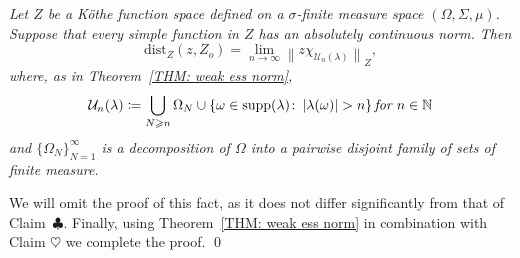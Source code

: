 \documentclass[11pt]{amsart}
\theoremstyle{definition}
\theoremstyle{definition}
\theoremstyle{definition}
\theoremstyle{definition}
\theoremstyle{definition}
\theoremstyle{definition}
\theoremstyle{definition}
\theoremstyle{definition}
\numberwithin{equation}{section}
\numberwithin{equation}{section}
\numberwithin{equation}{section}
\theoremstyle{definition}
\theoremstyle{definition}
\theoremstyle{definition}
\theoremstyle{definition}
\theoremstyle{definition}
\theoremstyle{definition}
\DeclareMathOperator{\supp}{supp}
\newcommand{\norm}[1]{\left\lVert#1\right\rVert}
\newcommand{\abs}[1]{\left\lvert#1\right\rvert}
\renewenvironment{proof}{\noindent {\bf Proof.}}{\qed}
\begin{document}
\begin{proof}
	\vspace{5pt} 
	{\it Let $Z$ be a K{\" o}the function space defined on a $\sigma$-finite measure space $(\Omega,\Sigma,\mu)$.
		Suppose that every simple function in $Z$ has an absolutely continuous norm. Then}
		\begin{equation}
			\text{dist}_Z(z,Z_o) = \lim\limits_{n \rightarrow \infty} \norm{z \chi_{\mathcal{U}_n(\lambda)}}_Z,
		\end{equation}
	{\it where, as in Theorem~\ref{THM: weak ess norm},}
		\begin{equation*}
			\mathcal{U}_n(\lambda) \coloneqq \bigcup\limits_{N\geqslant n}\Omega_N
				\cup \left\{ \omega \in \supp(\lambda) \colon \abs{\lambda(\omega)} > n \right\} \text{\it for } n \in \mathbb{N}
		\end{equation*}
	{\it and $\{\Omega_N\}_{N=1}^{\infty}$ is a decomposition of $\Omega$ into a pairwise disjoint family of sets of finite measure.}
	
	\vspace{5pt} We will omit the proof of this fact, as it does not differ significantly from that of Claim~$\clubsuit$. Finally, using
	Theorem~\ref{THM: weak ess norm} in combination with Claim $\heartsuit$ we complete the proof.
\end{proof}
\end{document}
